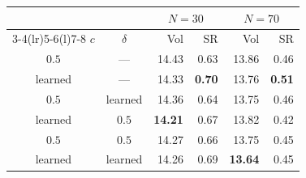 \begin{tabular}{@{}ccrrrr@{}}
\toprule
 & & \multicolumn{2}{c}{$N=30$} & \multicolumn{2}{c}{$N=70$}\\
\cmidrule(lr){3-4}\cmidrule(lr){5-6}\cmidrule(l){7-8}
$c$ & $\delta$ & Vol & SR & Vol & SR\\
\midrule
$0.5$ & --- & 14.43 & 0.63 & 13.86 & 0.46\\
learned & --- & 14.33 & \textbf{0.70} & 13.76 & \textbf{0.51}\\
\addlinespace[2pt]
$0.5$ & learned & 14.36 & 0.64 & 13.75 & 0.46\\
learned & $0.5$ & \textbf{14.21} & 0.67 & 13.82 & 0.42\\
$0.5$ & $0.5$ & 14.27 & 0.66 & 13.75 & 0.45\\
\addlinespace[2pt]
learned & learned & 14.26 & 0.69 & \textbf{13.64} & 0.45\\
\bottomrule
\end{tabular}
